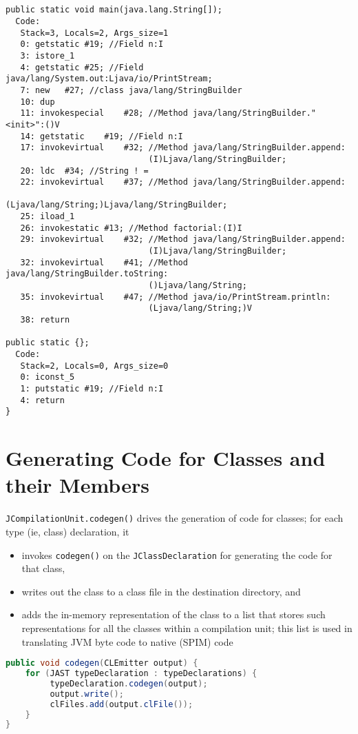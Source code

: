 \documentclass[8pt,a4paper,compress]{beamer}
\begin{document}
\begin{frame}[fragile]
\pause

\begin{lstlisting}[language={}]


public static void main(java.lang.String[]);
  Code:
   Stack=3, Locals=2, Args_size=1
   0: getstatic #19; //Field n:I
   3: istore_1
   4: getstatic #25; //Field java/lang/System.out:Ljava/io/PrintStream;
   7: new   #27; //class java/lang/StringBuilder
   10: dup
   11: invokespecial    #28; //Method java/lang/StringBuilder."<init>":()V
   14: getstatic    #19; //Field n:I
   17: invokevirtual    #32; //Method java/lang/StringBuilder.append:
                             (I)Ljava/lang/StringBuilder;
   20: ldc  #34; //String ! =
   22: invokevirtual    #37; //Method java/lang/StringBuilder.append:
                             (Ljava/lang/String;)Ljava/lang/StringBuilder;
   25: iload_1
   26: invokestatic #13; //Method factorial:(I)I
   29: invokevirtual    #32; //Method java/lang/StringBuilder.append:
                             (I)Ljava/lang/StringBuilder;
   32: invokevirtual    #41; //Method java/lang/StringBuilder.toString:
                             ()Ljava/lang/String;
   35: invokevirtual    #47; //Method java/io/PrintStream.println:
                             (Ljava/lang/String;)V
   38: return

public static {};
  Code:
   Stack=2, Locals=0, Args_size=0
   0: iconst_5
   1: putstatic #19; //Field n:I
   4: return
}
\end{lstlisting}
\end{frame}

\section{Generating Code for Classes and their Members}
\begin{frame}[fragile]
\pause

\lstinline{JCompilationUnit.codegen()} drives the generation of code for classes; for each type (ie, class) declaration, it
\begin{itemize}
\item invokes \lstinline{codegen()} on the \lstinline{JClassDeclaration} for generating the code for that class,
\item writes out the class to a class file in the destination directory, and
\item adds the in-memory representation of the class to a list that stores such representations for all the classes within a compilation unit; this list is used in translating JVM byte code to native (SPIM) code
\end{itemize}

\begin{lstlisting}[language=Java]
public void codegen(CLEmitter output) {
    for (JAST typeDeclaration : typeDeclarations) {
         typeDeclaration.codegen(output);
         output.write();
         clFiles.add(output.clFile());
    }
}
\end{lstlisting}
\end{frame}
\end{document}
